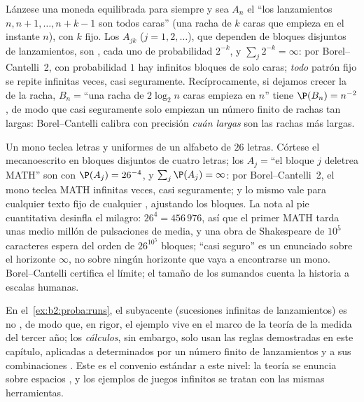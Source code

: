 \begin{example}\label{ex:b2:proba:runs}
Lánzese una moneda equilibrada para siempre y sea $A_n$ el 
``los lanzamientos $n, n+1, \dots, n + k - 1$ son todos caras'' (una
racha de $k$ caras que empieza en el instante $n$), con $k$ fijo. Los
 $A_{jk}$ ($j = 1, 2, \dots$), que dependen de bloques
disjuntos de lanzamientos, son , cada uno de
probabilidad $2^{-k}$, y $\sum_j 2^{-k} = \infty$: por
Borel--Cantelli~2, con probabilidad $1$ hay infinitos bloques de solo
caras; \emph{todo} patrón fijo se repite infinitas veces, casi
seguramente. Recíprocamente, si dejamos crecer la  de la
racha, $B_n = {}$``una racha de $2\log_2 n$ caras empieza en $n$''
tiene $\P(B_n) = n^{-2}$ , de modo que casi seguramente solo
empiezan un número finito de rachas tan largas: Borel--Cantelli
calibra con precisión \emph{cuán largas} son las rachas más largas.
\end{example}

\begin{example}
Un mono teclea letras  y uniformes de un alfabeto de
$26$ letras. Córtese el mecanoescrito en bloques disjuntos de cuatro
letras; los  $A_j = {}$``el bloque $j$ deletrea MATH'' son
 con $\P(A_j) = 26^{-4}$, y $\sum_j\P(A_j) = \infty$:
por Borel--Cantelli~2, el mono teclea MATH infinitas veces, casi
seguramente; y lo mismo vale para cualquier texto fijo de cualquier
, ajustando los bloques. La nota al pie cuantitativa desinfla
el milagro: $26^4 = 456\,976$, así que el primer MATH tarda unas
medio millón de pulsaciones de media, y una obra de Shakespeare de
$10^5$ caracteres espera del orden de $26^{10^5}$ bloques; ``casi
seguro'' es un enunciado sobre el horizonte $\infty$, no sobre ningún
horizonte que vaya a encontrarse un mono. Borel--Cantelli certifica
el límite; el tamaño de los sumandos cuenta la historia a escalas
humanas.
\end{example}

\begin{remark}
En el~\cref{ex:b2:proba:runs}, el  subyacente
(sucesiones infinitas de lanzamientos) es no , de modo que,
en rigor, el ejemplo vive en el marco de la teoría de la medida del
tercer año; los \emph{cálculos}, sin embargo, solo usan las reglas
demostradas en este capítulo, aplicadas a  determinados por un
número finito de lanzamientos y a sus combinaciones . Este
es el convenio estándar a este nivel: la teoría se enuncia sobre
espacios , y los ejemplos de juegos infinitos se tratan con
las mismas herramientas.
\end{remark}

